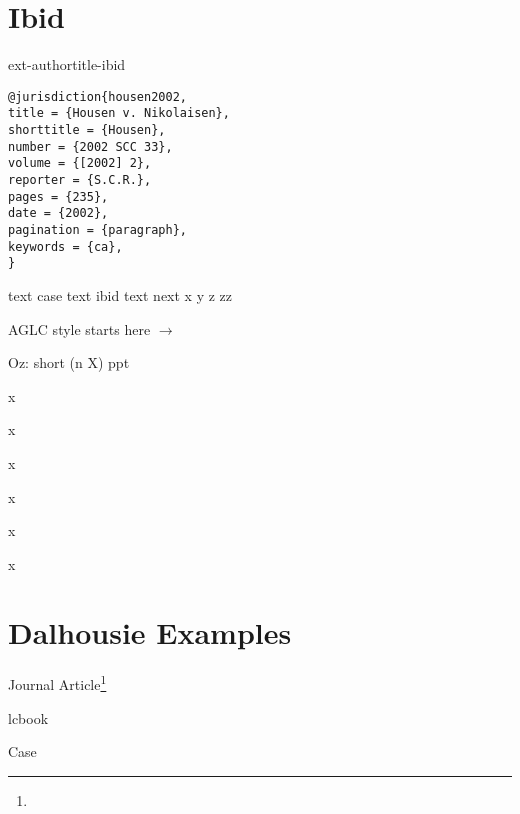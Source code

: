 



\section{Ibid}
ext-authortitle-ibid

\begin{verbatim}
@jurisdiction{housen2002,
title = {Housen v. Nikolaisen},
shorttitle = {Housen},
number = {2002 SCC 33},
volume = {[2002] 2},
reporter = {S.C.R.},
pages = {235},
date = {2002},
pagination = {paragraph},
keywords = {ca},
}

\end{verbatim}


text case text ibid text next
x
y
z
zz

{
AGLC style starts here $\rightarrow$
\lcsetstyleaglc

Oz: short (n X) ppt

x

x

x

x

x

x

}



\section{Dalhousie Examples}

Journal Article\footnote{}

lcbook

Case

